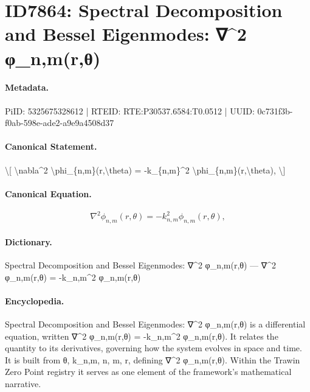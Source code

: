 \section*{ID7864: Spectral Decomposition and Bessel Eigenmodes: ∇\textasciicircum{}2 φ\_n,m(r,θ)}
\paragraph{Metadata.}
PiID: 5325675328612 | RTEID: RTE:P30537.6584:T0.0512 | UUID: 0c731f3b-f0ab-598e-ade2-a9e9a4508d37

\paragraph{Canonical Statement.}
\textbackslash{}[ \textbackslash{}nabla\textasciicircum{}2 \textbackslash{}phi\_\{n,m\}(r,\textbackslash{}theta) = -k\_\{n,m\}\textasciicircum{}2 \textbackslash{}phi\_\{n,m\}(r,\textbackslash{}theta), \textbackslash{}]

\paragraph{Canonical Equation.}
\[
\nabla^2 \phi_{n,m}(r,\theta) = -k_{n,m}^2 \phi_{n,m}(r,\theta),
\]

\paragraph{Dictionary.}
Spectral Decomposition and Bessel Eigenmodes: ∇\textasciicircum{}2 φ\_n,m(r,θ) — ∇\textasciicircum{}2 φ\_n,m(r,θ) = -k\_n,m\textasciicircum{}2 φ\_n,m(r,θ)

\paragraph{Encyclopedia.}
Spectral Decomposition and Bessel Eigenmodes: ∇\textasciicircum{}2 φ\_n,m(r,θ) is a differential equation, written ∇\textasciicircum{}2 φ\_n,m(r,θ) = -k\_n,m\textasciicircum{}2 φ\_n,m(r,θ). It relates the quantity to its derivatives, governing how the system evolves in space and time. It is built from θ, k\_n,m, n, m, r, defining ∇\textasciicircum{}2 φ\_n,m(r,θ). Within the Trawin Zero Point registry it serves as one element of the framework's mathematical narrative.
